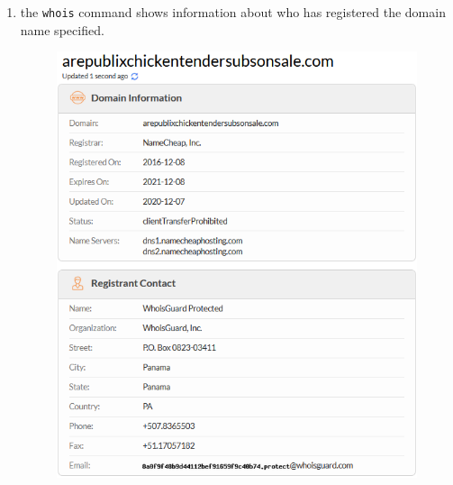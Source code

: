 \begin{enumerate}
    \item the \verb|whois| command shows information about who has registered the domain name specified.
    \begin{figure}[H]
        \centering
        \includegraphics[width=\linewidth]{figures/whois1.png}
    \end{figure}
    \begin{figure}[H]
        \centering

\end{figure}
\end{enumerate}

